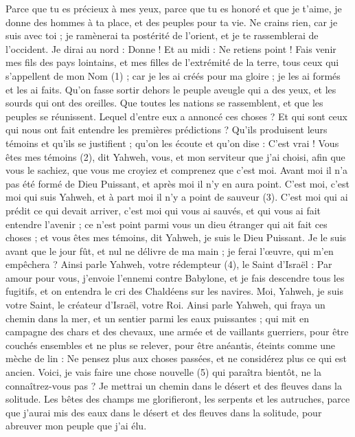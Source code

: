 \begin{multicols}{2}
{Parce que tu es précieux à mes yeux, parce que tu es honoré et que je t’aime, je donne des hommes à ta place, et des peuples pour ta vie.
Ne crains rien, car je suis avec toi ; je ramènerai ta postérité de l’orient, et je te rassemblerai de l’occident.
Je dirai au nord : Donne ! Et au midi : Ne retiens point ! Fais venir mes fils des pays lointains, et mes filles de l’extrémité de la terre,
tous ceux qui s’appellent de mon Nom (1) ; car je les ai créés pour ma gloire ; je les ai formés et les ai faits.
Qu’on fasse sortir dehors le peuple aveugle qui a des yeux, et les sourds qui ont des oreilles.
Que toutes les nations se rassemblent, et que les peuples se réunissent. Lequel d'entre eux a annoncé ces choses ? Et qui sont ceux qui nous ont fait entendre les premières prédictions ? Qu'ils produisent leurs témoins et qu'ils se justifient ; qu'on les écoute et qu’on dise : C’est vrai !
Vous êtes mes témoins (2), dit Yahweh, vous, et mon serviteur que j'ai choisi, afin que vous le sachiez, que vous me croyiez et comprenez que c'est moi. Avant moi il n’a pas été formé de Dieu Puissant, et après moi il n'y en aura point.
C'est moi, c'est moi qui suis Yahweh, et à part moi il n'y a point de sauveur (3).
C'est moi qui ai prédit ce qui devait arriver, c'est moi qui vous ai sauvés, et qui vous ai fait entendre l'avenir ; ce n’est point parmi vous un dieu étranger qui ait fait ces choses ; et vous êtes mes témoins, dit Yahweh, je suis le Dieu Puissant.
Je le suis avant que le jour fût, et nul ne délivre de ma main ; je ferai l’œuvre, qui m'en empêchera ?
Ainsi parle Yahweh, votre rédempteur (4), le Saint d'Israël : Par amour pour vous, j’envoie l’ennemi contre Babylone, et je fais descendre tous les fugitifs, et on entendra le cri des Chaldéens sur les navires.
Moi, Yahweh, je suis votre Saint, le créateur d'Israël, votre Roi.
Ainsi parle Yahweh, qui fraya un chemin dans la mer, et un sentier parmi les eaux puissantes ;
qui mit en campagne des chars et des chevaux, une armée et de vaillants guerriers, pour être couchés ensembles et ne plus se relever, pour être anéantis, éteints comme une mèche de lin :
Ne pensez plus aux choses passées, et ne considérez plus ce qui est ancien.
Voici, je vais faire une chose nouvelle (5) qui paraîtra bientôt, ne la connaîtrez-vous pas ? Je mettrai un chemin dans le désert et des fleuves dans la solitude.
Les bêtes des champs me glorifieront, les serpents et les autruches, parce que j'aurai mis des eaux dans le désert et des fleuves dans la solitude, pour abreuver mon peuple que j'ai élu.
}
\end{multicols}

